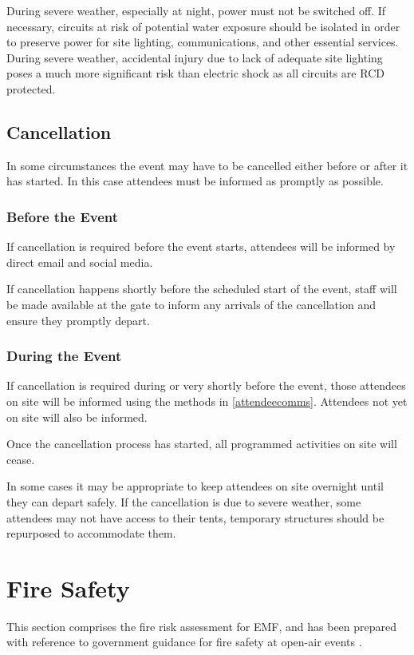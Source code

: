 During severe weather, especially at night, power must not be switched off. If
necessary, circuits at risk of potential water exposure should be isolated in
order to preserve power for site lighting, communications, and other essential services.
During severe weather, accidental injury due to lack of adequate site lighting poses a
much more significant risk than electric shock as all circuits are RCD protected.

\subsection{Cancellation}\label{cancellation}
In some circumstances the event may have to be cancelled either before or after it has
started. In this case attendees must be informed as promptly as possible.

\subsubsection{Before the Event}
If cancellation is required before the event starts, attendees will be informed by
direct email and social media. 

If cancellation happens shortly before the scheduled start of the event, staff will
be made available at the gate to inform any arrivals of the cancellation and ensure
they promptly depart.

\subsubsection{During the Event}
If cancellation is required during or very shortly before the event, those attendees
on site will be informed using the methods in \cref{attendeecomms}. Attendees
not yet on site will also be informed.

Once the cancellation process has started, all programmed activities on site will
cease.

In some cases it may be appropriate to keep attendees on site overnight
until they can depart safely. If the cancellation is due to severe weather, some
attendees may not have access to their tents, temporary structures should be repurposed
to accommodate them.

\newpage

\section{Fire Safety}\label{fire}

This section comprises the fire risk assessment for EMF, and has been prepared with reference
to government guidance for fire safety at open-air events \cite{firesafety}.

